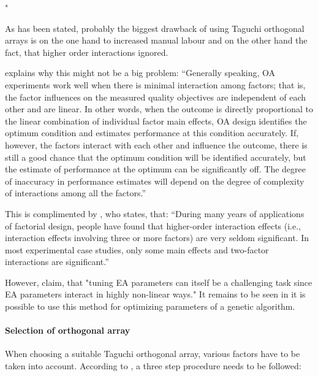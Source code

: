 "\cite{mills_determining_2015}

As has been stated, probably the biggest drawback of using Taguchi orthogonal arrays is on the one hand to increased manual labour and on the other hand the fact, that higher order interactions ignored.

\cite{roy_primer_1990} explains why this might not be a big problem:
\enquote{Generally speaking, OA experiments work well when there is minimal interaction among factors; that is, the factor influences on the measured quality objectives are independent of each other and are linear. In other words, when the outcome is directly proportional to the linear combination of individual factor main effects, OA design identifies the optimum condition and estimates performance at this condition accurately. If, however, the factors interact with each other and influence the outcome, there is still a good chance that the optimum condition will be identified accurately, but the estimate of performance at the optimum can be significantly off. The degree of inaccuracy in performance estimates will depend on the degree of complexity of interactions among all the factors.}

This is complimented by \cite{yang_design_2009}, who states, that:
\enquote{During many years of applications of factorial design, people have found that higher-order interaction effects (i.e., interaction effects involving three or more factors) are very seldom significant. In most experimental case studies, only some main effects and two-factor interactions are significant.}

However, \cite{kacprzyk_parameter_2007} claim, that "tuning EA parameters can itself be a challenging task since EA parameters interact in highly non-linear ways." It remains to be seen in it is possible to use this method for optimizing parameters of a genetic algorithm.

\paragraph{Selection of orthogonal array}
When choosing a suitable Taguchi orthogonal array, various factors have to be taken into account. According to \cite{yang_design_2009}, a three step procedure needs to be followed:

